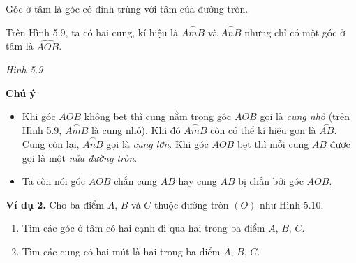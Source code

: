 \begin{lesson}
    \begin{keyconcept}
        Góc ở tâm là góc có đỉnh trùng với tâm của đường tròn.
    \end{keyconcept}

    Trên Hình 5.9, ta có hai cung, kí hiệu là $\overset{\frown}{AmB}$ và $\overset{\frown}{AnB}$ nhưng chỉ có một góc ở tâm là $\widehat{AOB}$.

    \begin{center}

        \textit{Hình 5.9}
    \end{center}

    \textbf{Chú ý}
    \begin{itemize}
        \item Khi góc $AOB$ không bẹt thì cung nằm trong góc $AOB$ gọi là \textit{cung nhỏ} (trên Hình 5.9, $\overset{\frown}{AmB}$ là cung nhỏ). Khi đó $\overset{\frown}{AmB}$ còn có thể kí hiệu gọn là $\overset{\frown}{AB}$. Cung còn lại, $\overset{\frown}{AnB}$ gọi là \textit{cung lớn}. Khi góc $AOB$ bẹt thì mỗi cung $AB$ được gọi là một \textit{nửa đường tròn}.
        \item Ta còn nói góc $AOB$ chắn cung $AB$ hay cung $AB$ bị chắn bởi góc $AOB$.
    \end{itemize}

    \textbf{Ví dụ 2.} Cho ba điểm $A$, $B$ và $C$ thuộc đường tròn $(O)$ như Hình 5.10.
    \begin{enumerate}[label=\alph*)]
        \item Tìm các góc ở tâm có hai cạnh đi qua hai trong ba điểm $A$, $B$, $C$.
        \item Tìm các cung có hai mút là hai trong ba điểm $A$, $B$, $C$.
    \end{enumerate}


\end{lesson}
